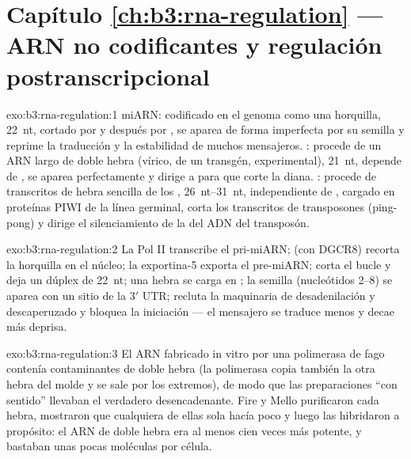 \section*{Capítulo \ref{ch:b3:rna-regulation} --- ARN no codificantes y regulación postranscripcional}

\begin{solution}{exo:b3:rna-regulation:1}
miARN: codificado en el genoma como una horquilla, \qty{22}{nt},
cortado por  y después por , se aparea de forma imperfecta
por su semilla y reprime la traducción y la estabilidad de muchos
mensajeros. : procede de un ARN largo de doble hebra (vírico, de un
transgén, experimental), \qty{21}{nt}, depende de , se aparea
perfectamente y dirige a  para que corte la diana. :
procede de transcritos de hebra sencilla de los ,
\qtyrange{26}{31}{nt}, independiente de , cargado en proteínas PIWI
de la línea germinal, corta los transcritos de transposones (ping-pong) y
dirige el silenciamiento de la  del ADN del transposón.
\end{solution}

\begin{solution}{exo:b3:rna-regulation:2}
La Pol II transcribe el pri-miARN;  (con DGCR8) recorta la
horquilla en el núcleo; la exportina-5 exporta el pre-miARN;  corta
el bucle y deja un dúplex de \qty{22}{nt}; una hebra se carga en
; la semilla (nucleótidos 2--8) se aparea con un sitio de la
3$'$ UTR;  recluta la maquinaria de desadenilación y
descaperuzado y bloquea la iniciación --- el mensajero se traduce menos y
decae más deprisa.
\end{solution}

\begin{solution}{exo:b3:rna-regulation:3}
El ARN fabricado in vitro por una polimerasa de fago contenía
contaminantes de doble hebra (la polimerasa copia también la otra hebra
del molde y se sale por los extremos), de modo que las preparaciones ``con
sentido'' llevaban el verdadero desencadenante. Fire y Mello purificaron
cada hebra, mostraron que cualquiera de ellas sola hacía poco y luego las
hibridaron a propósito: el ARN de doble hebra era al menos cien veces más
potente, y bastaban unas pocas moléculas por célula.
\end{solution}

